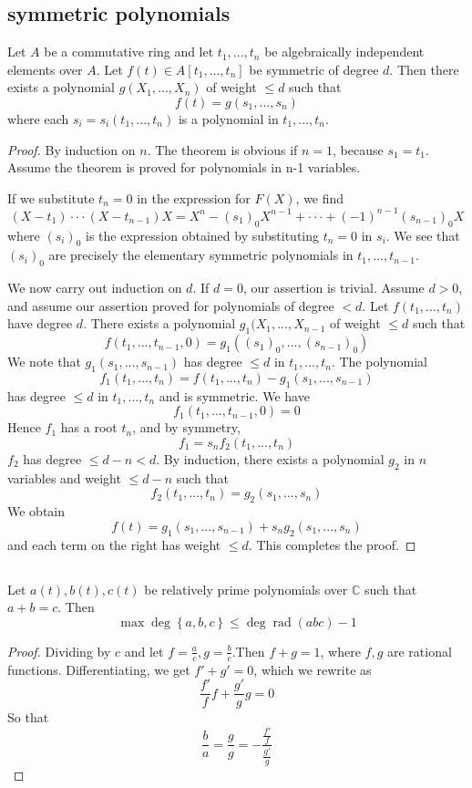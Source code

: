 \subsection{symmetric polynomials}


\begin{theorem}
Let $A$ be a commutative ring and let $t_1,...,t_n$ be algebraically independent elements over $A$. Let $f(t)\in A[t_1,...,t_n] $ be symmetric of degree $d$. Then there exists a polynomial $g(X_1,...,X_n)$ of weight $\le d$ such that\[f(t)=g(s_1,...,s_n)\] where each $s_i=s_i(t_1,...,t_n)$ is a polynomial in $t_1,...,t_n$.
\end{theorem}
\begin{proof}
By induction on $n$. The theorem is obvious if $n=1$, because $s_1=t_1$. Assume the theorem is proved for polynomials in n-1 variables.\par
If we substitute $t_n=0$ in the expression for $F(X)$, we find \[(X-t_1)\cdot \cdot \cdot (X-t_{n-1})X=X^n-(s_1)_0X^{n-1}+\cdot \cdot \cdot +(-1)^{n-1}(s_{n-1})_0X\] where $(s_i)_0$ is the expression obtained by substituting $t_n=0$ in $s_i$. We see that $(s_i)_0$ are precisely the elementary symmetric polynomials in $t_1,...,t_{n-1}$.\par
We now carry out induction on $d$. If $d=0$, our assertion is trivial. Assume $d>0$, and assume our assertion proved for polynomials of degree $<d$. Let $f(t_1,...,t_n)$ have degree $d$. There exists a polynomial $g_1(X_1,...,X_{n-1}$ of weight $\le d$ such that \[f(t_1,...,t_{n-1},0)=g_1((s_1)_0,...,(s_{n-1})_0)\]
We note that $g_1(s_1,...,s_{n-1})$ has degree $\le d$ in $t_1,...,t_n$. The polynomial \[f_1(t_1,...,t_n)=f(t_1,...,t_n)-g_1(s_1,...,s_{n-1})\]
has degree $\le d$ in $t_1,...,t_n$ and is symmetric. We have \[f_1(t_1,...,t_{n-1},0)=0\]
Hence $f_1$ has a root $t_n$, and by symmetry, \[f_1=s_nf_2(t_1,...,t_n)\]
$f_2$ has degree $\le d-n < d$. By induction, there exists a polynomial $g_2$ in $n$ variables and weight $\le d-n$ such that \[f_2(t_1,...,t_n)=g_2(s_1,...,s_n)\]
We obtain \[f(t)=g_1(s_1,...,s_{n-1})+s_ng_2(s_1,...,s_n)\] and each term on the right has weight $\le d$. This completes the proof.
\end{proof}
\begin{corollary}
\end{corollary}

\subsection{}
\begin{theorem}
Let $a(t),b(t),c(t)$ be relatively prime polynomials over $\mathbb{C}$ such that $a+b=c$. Then \[\max \operatorname{deg}\left \{a,b,c\right \}\le \operatorname{deg} \operatorname{rad}(abc) -1\]
\end{theorem}
\begin{proof}
 Dividing by $c$ and let $f=\frac{a}{c},g=\frac{b}{c}$.Then $f+g=1$, where $f,g$ are rational functions. Differentiating, we get $f'+g'=0$, which we rewrite as \[\frac{f'}{f}f+\frac{g'}{g}g=0\]
So that \[\frac{b}{a}=\frac{g}{g}=-\frac{\frac{f'}{f}}{\frac{g'}{g}}\]
\end{proof}

